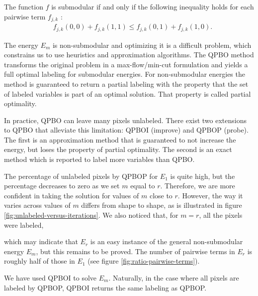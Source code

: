 \documentclass[smallextended]{svjour3}       %
\begin{document}
{The function $f$ is submodular if and only if the following inequality holds for each pairwise term $f_{j,k}$ \cite{kolmogorov04whatenergies}:
\begin{align*}
  \quad f_{j,k}(0,0) + f_{j,k}(1,1) \leq f_{j,k}(0,1) + f_{j,k}(1,0).
\end{align*}

The energy $E_m$ is non-submodular and optimizing it is a difficult problem, which constrains us to use heuristics and
approximation algorithms. The QPBO method \cite{rother07qpbo} transforms the original problem in a max-flow/min-cut
formulation and yields a full optimal labeling for submodular energies. For non-submodular energies the method is
guaranteed to return a partial labeling with the property that the set of labeled variables is part of an optimal
solution. That property is called partial optimality.

In practice, QPBO can leave many pixels unlabeled. There exist two extensions to QPBO that alleviate this limitation:
QPBOI (improve) and QPBOP (probe). The first is an approximation method that is guaranteed to not increase the energy,
but loses the property of partial optimality. The second is an exact method which is reported to label more variables
than QPBO.

The percentage of unlabeled pixels by QPBOP for $E_1$ is quite high, but the percentage decreases to zero as we set $m$
equal to $r$. Therefore, we are more confident in taking the solution for values of $m$ close to $r$. However, the way it
varies across values of $m$ differs from shape to shape, as is illustrated in figure
\ref{fig:unlabeled-versus-iterations}. We also noticed that, for $m=r$, all the pixels were labeled, {which may
  indicate that $E_r$ is an easy instance of the general non-submodular energy $E_m$, but this remains to be
  proved. The number of pairwise terms in $E_r$ is roughly half of those in $E_1$ (see figure
  \ref{fig:ratio-pairwise-terms}).

  We have used QPBOI to solve $E_m$. Naturally, in the case where all pixels are labeled by QPBOP, QPBOI returns the
  same labeling as QPBOP.


}}
\end{document}
